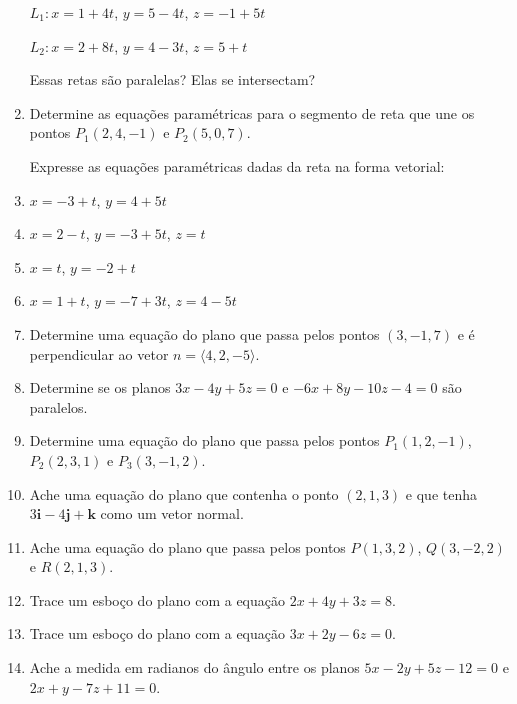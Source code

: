 \documentclass[11pt,a4paper]{article}
\begin{document}
\begin{enumerate}
	$L_1 : x = 1 + 4t$, \quad $y = 5 - 4t$, \quad $z = -1 + 5t$
	
	$L_2 : x = 2 + 8t$, \quad $y = 4 - 3t$, \quad $z = 5 + t$
	 
	 Essas retas são paralelas? Elas se intersectam? 
	
	\item Determine as equações paramétricas para o segmento de reta que une os pontos $P_1(2,4,-1)$ e $P_2(5,0,7)$.
	
	Expresse as equações paramétricas dadas da reta na forma vetorial:
	
	\item $x = -3 + t$, \quad $y = 4 + 5t$
	\item $x = 2 - t$, \quad $y = -3 + 5t$, \quad $z = t$
	
	
	
	
	
	\item $x = t$, \quad $y = -2 + t$
	\item $x = 1 + t$, \quad $y = -7 + 3t$, \quad $z = 4 - 5t$
	
	\item Determine uma equação do plano que passa pelos pontos $(3,-1,7)$ e é perpendicular ao vetor $n = \langle 4, 2, -5 \rangle$.
	
	\item Determine se os planos
	$3x - 4y + 5z = 0$ e $-6x + 8y - 10z - 4 = 0$
	são paralelos.
	
	\item Determine uma equação do plano que passa pelos pontos $P_1(1,2,-1)$, $P_2(2,3,1)$ e $P_3(3,-1,2)$.
	
	\item Ache uma equação do plano que contenha o ponto $(2,1,3)$ e que tenha  $3\textbf{i} - 4\textbf{j} + \textbf{k}$ como um vetor normal.
	
	\item Ache uma equação do plano que passa pelos pontos $P(1,3,2)$,    $Q(3,-2,2)$ e $R(2,1,3)$.   
	
	\item Trace um esboço do plano com a equação $2x + 4y + 3z = 8$.
	
	
	
	
	
	\item Trace um esboço do plano com a equação $3x + 2y - 6z = 0$.
	
	\item Ache a medida em radianos do ângulo entre os planos 
	$5x - 2y + 5z - 12 = 0$ e $2x + y - 7z + 11 = 0$.
	

\end{enumerate}
\end{document}
